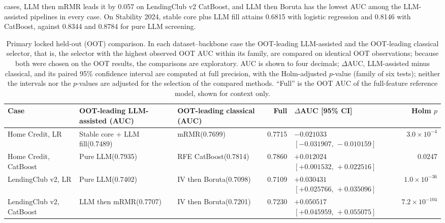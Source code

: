 \documentclass[final,5p,twocolumn]{elsarticle}
\begin{document}
cases, LLM then mRMR leads it by 0.057 on LendingClub v2 CatBoost, and LLM then Boruta has the lowest AUC among the LLM-assisted pipelines in every case. On Stability 2024, stable core plus LLM fill attains 0.6815 with logistic regression and 0.8146 with CatBoost, against 0.8344 and 0.8784 for pure LLM screening.

\begin{table}[htbp]
\centering
\scriptsize
\setlength{\tabcolsep}{3pt}
\begin{threeparttable}
\caption{Primary locked held-out (OOT) comparison. In each dataset--backbone case the OOT-leading LLM-assisted and the OOT-leading classical selector, that is, the selector with the highest observed OOT AUC within its family, are compared on identical OOT observations; because both were chosen on the OOT results, the comparisons are exploratory. AUC is shown to four decimals; $\Delta$AUC, LLM-assisted minus classical, and its paired 95\% confidence interval are computed at full precision, with the Holm-adjusted $p$-value (family of six tests); neither the intervals nor the $p$-values are adjusted for the selection of the compared methods. ``Full'' is the OOT AUC of the full-feature reference model, shown for context only.}
\label{tab:primary_results}
\begin{tabular}{@{}L{21mm}L{25mm}L{22mm}rL{36mm}r@{}}
\toprule
Case & OOT-leading LLM-assisted (AUC) & OOT-leading classical (AUC) & Full & $\Delta$AUC [95\% CI] & Holm $p$ \\
\midrule
Home Credit, LR & Stable core + LLM fill\newline (0.7489) & mRMR\newline (0.7699) & 0.7715 & $-0.021033$\newline $[-0.031907,\,-0.010159]$ & $3.0\times10^{-4}$ \\
\addlinespace
Home Credit, CatBoost & Pure LLM\newline (0.7935) & RFE CatBoost\newline (0.7814) & 0.7860 & $+0.012024$\newline $[+0.001532,\,+0.022516]$ & 0.0247 \\
\addlinespace
LendingClub v2, LR & Pure LLM\newline (0.7402) & IV then Boruta\newline (0.7098) & 0.7109 & $+0.030431$\newline $[+0.025766,\,+0.035096]$ & $1.0\times10^{-36}$ \\
\addlinespace
LendingClub v2, CatBoost & LLM then mRMR\newline (0.7707) & IV then Boruta\newline (0.7201) & 0.7230 & $+0.050517$\newline $[+0.045959,\,+0.055075]$ & $7.2\times10^{-104}$ \\

\end{tabular}
\end{threeparttable}
\end{table}
\end{document}
